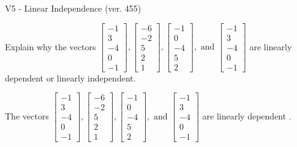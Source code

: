 \begin{exercise}
  \begin{exerciseTitle}V5 - Linear Independence (ver. 455)\end{exerciseTitle}
  \begin{exerciseStatement}
    Explain why the vectors \(\left[\begin{array}{r}
-1 \\
3 \\
-4 \\
0 \\
-1
\end{array}\right] , \left[\begin{array}{r}
-6 \\
-2 \\
5 \\
2 \\
1
\end{array}\right] , \left[\begin{array}{r}
-1 \\
0 \\
-4 \\
5 \\
2
\end{array}\right] , \text{ and } \left[\begin{array}{r}
-1 \\
3 \\
-4 \\
0 \\
-1
\end{array}\right]\) are linearly dependent or linearly independent.	


  \end{exerciseStatement}
  \begin{exerciseAnswer}
   The vectors \(\left[\begin{array}{r}
-1 \\
3 \\
-4 \\
0 \\
-1
\end{array}\right] , \left[\begin{array}{r}
-6 \\
-2 \\
5 \\
2 \\
1
\end{array}\right] , \left[\begin{array}{r}
-1 \\
0 \\
-4 \\
5 \\
2
\end{array}\right] , \text{ and } \left[\begin{array}{r}
-1 \\
3 \\
-4 \\
0 \\
-1
\end{array}\right]\) are 
  	 linearly dependent  .
  


  \end{exerciseAnswer}
\end{exercise}